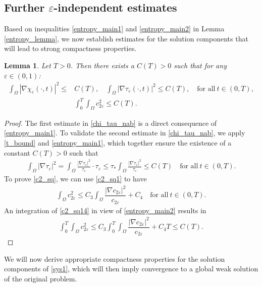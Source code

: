 \documentclass[a4paper,10pt]{article}
\newtheorem{Lemma}[Theorem]{Lemma}
\theoremstyle{definition}
\begin{document}
\subsection{Further $\varepsilon$-independent estimates}

Based on inequalities \eqref{entropy_main1} and \eqref{entropy_main2} in Lemma \ref{entropy_lemma}, we now establish estimates for the solution components that will lead to strong compactness properties.

\begin{Lemma}
 \label{nab_bound_lem}
   Let $T > 0$. Then there exists a $C(T) > 0$ such that for any $\varepsilon \in (0, 1)$:
   \begin{align}
     \label{chi_tau_nab}  \int_\Omega |\nabla \chi_\varepsilon(\cdot, t)|^2 \leq & C(T),  \quad  \int_\Omega |\nabla \tau_\varepsilon(\cdot, t)|^2 \leq C(T),  \quad \text{for all} ~ t \in (0, T), \\[5pt]
     \label{c2_sq} & \int_0^T \int_\Omega c_{2\varepsilon}^2 \leq C(T).
   \end{align}
 \end{Lemma}
\begin{proof}
  The first estimate in \eqref{chi_tau_nab} is a direct consequence of \eqref{entropy_main1}. To validate the second estimate in \eqref{chi_tau_nab}, we apply \eqref{t_bound} and \eqref{entropy_main1}, which together ensure the existence of a constant $C(T) > 0$ such that
  \begin{align*}
    \int_\Omega |\nabla \tau_\varepsilon|^2 =  \int_\Omega \frac{|\nabla \tau_\varepsilon|^2}{\tau_\varepsilon} \cdot \tau_\varepsilon \leq \tau_\ast \int_\Omega \frac{|\nabla \tau_\varepsilon|^2}{\tau_\varepsilon} \leq C(T)  \quad \text{for all} ~ t \in (0, T).
  \end{align*}
 To prove \eqref{c2_sq}, we can use \eqref{c2_sq1} to have
 \begin{align}
 \label{c2_sq14}
   \int_\Omega c_{2\varepsilon}^2 \leq C_3 \int_\Omega \dfrac{|\nabla c_{2\varepsilon}|^2}{c_{2\varepsilon}} + C_4  \quad \text{for all} ~  t \in (0, T).
  \end{align}
 An integration of \eqref{c2_sq14} in view of \eqref{entropy_main2} results in
  \begin{align*}
    \int_0^T \int_\Omega c_{2\varepsilon}^2 \leq C_3 \int_0^T \int_\Omega \dfrac{|\nabla c_{2\varepsilon}|^2}{c_{2\varepsilon}} + C_4 T \leq C(T).
  \end{align*}
\end{proof}
\noindent
We will now derive appropriate compactness properties for the solution components of \eqref{sys1}, which will then imply convergence to a global weak solution of the original problem.
\end{document}
